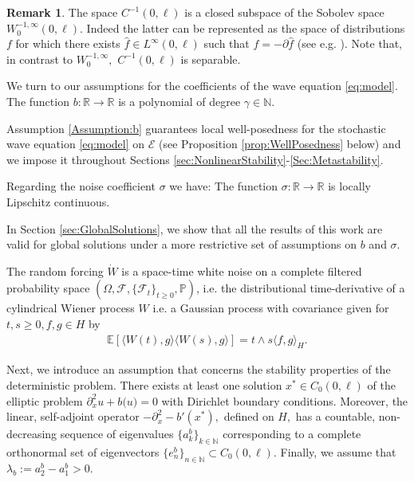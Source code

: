 \documentclass[10pt, reqno]{amsart}
\newcommand{\R}{\mathbb{R}}
\newcommand{\N}{\mathbb{N}}
\newcommand{\pr}{\mathbb{P}}
\newcommand{\ex}{\mathbb{E}}
\newcommand{\e}{\mathcal{E}}
\newenvironment{customthm}[1]
{\renewcommand\theinnercustomthm{#1}\innercustomthm}
{\endinnercustomthm}
\theoremstyle{definition}
\newtheorem{rem}{Remark}
\numberwithin{lem}{section}
\numberwithin{cor}{section}
\numberwithin{prop}{section}
\numberwithin{thm}{section}
\numberwithin{dfn}{section}
\begin{document}
      \begin{rem} The space $C^{-1}(0,\ell)$ is a closed subspace of the Sobolev space $W_0^{-1,\infty}(0,\ell).$ Indeed the latter can be represented as the space of distributions $f$ for which there exists $\hat{f}\in L^{\infty}(0,\ell)$ such that $f=-\partial \hat{f}$ (see e.g. \cite[Theorem 3.12]{adams2003sobolev}). Note that, in contrast to $W_0^{-1,\infty},$  $C^{-1}(0,\ell)$ is separable.
      \end{rem} 
    
     
     
   
      We turn to our assumptions for the coefficients of the wave equation \eqref{eq:model}.
      \begin{customthm}{1}\label{Assumption:b}   
    The function $b:\R\rightarrow \R$ is a polynomial of degree $\gamma\in\N.$
       \end{customthm}

       Assumption \ref{Assumption:b} guarantees local well-posedness for the stochastic wave equation \eqref{eq:model} on $\e$ (see Proposition \ref{prop:WellPosedness} below) and we impose it throughout Sections \ref{sec:NonlinearStability}-\ref{Sec:Metastability}.  


       Regarding the noise coefficient $\sigma$ we have: 
          \begin{customthm}{2}\label{Assumption:sigma} The function $\sigma:\R\rightarrow\R$ is locally Lipschitz continuous.
   \end{customthm}

   In Section \ref{sec:GlobalSolutions}, we show that all the results of this work are valid for global solutions under a more restrictive set of assumptions on $b$ and $\sigma$.

   
   The random forcing $\dot{W}$ is a space-time white noise on a complete filtered probability space $(\Omega, \mathcal{F}, \{  \mathcal{F}_t  \}_{t\geq 0}, \pr)$, i.e. the distributional time-derivative of a cylindrical Wiener process $W$ i.e.
   a Gaussian process with covariance given for $t,s\geq 0, f,g\in H$ by
   \begin{equation*}
       \begin{aligned}
           \ex[\langle W(t), g\rangle \langle W(s), g\rangle       ]=t\wedge s\langle f,g\rangle_H.
       \end{aligned}
   \end{equation*}

Next, we introduce an assumption that concerns the stability properties of the deterministic problem. 
  \begin{customthm}{3}\label{Assumption:xstar} There exists at least one solution $x^*\in C_0(0,\ell)$ of the elliptic problem $\partial^2_x u  +b\big( u\big)=0$ with Dirichlet boundary conditions. Moreover, the linear, self-adjoint operator $-\partial^2_x-b'(x^*),$ defined on $H,$ has a countable, non-decreasing sequence of eigenvalues $\{a_k^b\}_{k\in\N}$ corresponding to a complete orthonormal set of eigenvectors $\{e_n^b\}_{n\in\N}\subset C_0(0,\ell).$ Finally, we assume that  $\lambda_b:=a_2^b-a_1^b>0.$
   \end{customthm}
   
\end{document}
